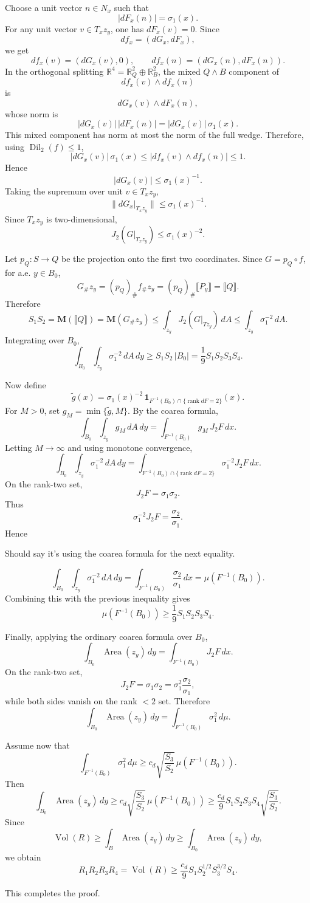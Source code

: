 \documentclass[12pt]{article}
\newcommand{\review}[1]{\begin{reviewbox}#1\end{reviewbox}}
\begin{document}
Choose a unit vector \(n\in N_x\) such that
\[
|dF_x(n)|=\sigma_1(x).
\]
For any unit vector \(v\in T_xz_y\), one has \(dF_x(v)=0\). Since
\[
df_x=(dG_x,dF_x),
\]
we get
\[
df_x(v)=(dG_x(v),0),
\qquad
df_x(n)=(dG_x(n),dF_x(n)).
\]
In the orthogonal splitting \(\mathbb R^4=\mathbb R^2_Q\oplus\mathbb R^2_B\), the mixed \(Q\wedge B\) component of
\[
df_x(v)\wedge df_x(n)
\]
is
\[
dG_x(v)\wedge dF_x(n),
\]
whose norm is
\[
|dG_x(v)|\,|dF_x(n)|
=
|dG_x(v)|\,\sigma_1(x).
\]
This mixed component has norm at most the norm of the full wedge. Therefore, using \(\operatorname{Dil}_2(f)\le 1\),
\[
|dG_x(v)|\,\sigma_1(x)
\le
|df_x(v)\wedge df_x(n)|
\le 1.
\]
Hence
\[
|dG_x(v)|\le \sigma_1(x)^{-1}.
\]
Taking the supremum over unit \(v\in T_xz_y\),
\[
\|dG_x|_{T_xz_y}\|\le \sigma_1(x)^{-1}.
\]
Since \(T_xz_y\) is two-dimensional,
\[
J_2(G|_{T_xz_y})\le \sigma_1(x)^{-2}.
\]

Let \(p_Q:S\to Q\) be the projection onto the first two coordinates. Since \(G=p_Q\circ f\), for a.e. \(y\in B_0\),
\[
G_\#z_y
=
(p_Q)_\# f_\#z_y
=
(p_Q)_\#\llbracket P_y\rrbracket
=
\llbracket Q\rrbracket.
\]
Therefore
\[
S_1S_2
=
\mathbf M(\llbracket Q\rrbracket)
=
\mathbf M(G_\#z_y)
\le
\int_{z_y}J_2(G|_{Tz_y})\,dA
\le
\int_{z_y}\sigma_1^{-2}\,dA.
\]
Integrating over \(B_0\),
\[
\int_{B_0}\int_{z_y}\sigma_1^{-2}\,dA\,dy
\ge
S_1S_2\,|B_0|
=
\frac19 S_1S_2S_3S_4.
\]

Now define
\[
\widetilde g(x)
=
\sigma_1(x)^{-2}\,
\mathbf 1_{F^{-1}(B_0)\cap\{\operatorname{rank}dF=2\}}(x).
\]
For \(M>0\), set \(g_M=\min\{\widetilde g,M\}\). By the coarea formula,
\[
\int_{B_0}\int_{z_y} g_M\,dA\,dy
=
\int_{F^{-1}(B_0)}g_M\,J_2F\,dx.
\]
Letting \(M\to\infty\) and using monotone convergence,
\[
\int_{B_0}\int_{z_y}\sigma_1^{-2}\,dA\,dy
=
\int_{F^{-1}(B_0)\cap\{\operatorname{rank}dF=2\}}
\sigma_1^{-2}J_2F\,dx.
\]
On the rank-two set,
\[
J_2F=\sigma_1\sigma_2.
\]
Thus
\[
\sigma_1^{-2}J_2F
=
\frac{\sigma_2}{\sigma_1}.
\]
Hence \review{Should say it's using the coarea formula for the next equality.}
\[
\int_{B_0}\int_{z_y}\sigma_1^{-2}\,dA\,dy
=
\int_{F^{-1}(B_0)}\frac{\sigma_2}{\sigma_1}\,dx
=
\mu(F^{-1}(B_0)).
\]
Combining this with the previous inequality gives
\[
\mu(F^{-1}(B_0))
\ge
\frac19 S_1S_2S_3S_4.
\]

Finally, applying the ordinary coarea formula over \(B_0\),
\[
\int_{B_0}\operatorname{Area}(z_y)\,dy
=
\int_{F^{-1}(B_0)}J_2F\,dx.
\]
On the rank-two set,
\[
J_2F=\sigma_1\sigma_2
=
\sigma_1^2\frac{\sigma_2}{\sigma_1},
\]
while both sides vanish on the rank \(<2\) set. Therefore
\[
\int_{B_0}\operatorname{Area}(z_y)\,dy
=
\int_{F^{-1}(B_0)}\sigma_1^2\,d\mu.
\]

Assume now that
\[
\int_{F^{-1}(B_0)}\sigma_1^2\,d\mu
\ge
c_d\sqrt{\frac{S_3}{S_2}}\,
\mu(F^{-1}(B_0)).
\]
Then
\[
\int_{B_0}\operatorname{Area}(z_y)\,dy
\ge
c_d\sqrt{\frac{S_3}{S_2}}\,
\mu(F^{-1}(B_0))
\ge
\frac{c_d}{9}
S_1S_2S_3S_4
\sqrt{\frac{S_3}{S_2}}.
\]
Since
\[
\operatorname{Vol}(R)
\ge
\int_B\operatorname{Area}(z_y)\,dy
\ge
\int_{B_0}\operatorname{Area}(z_y)\,dy,
\]
we obtain
\[
R_1R_2R_3R_4
=
\operatorname{Vol}(R)
\ge
\frac{c_d}{9}
S_1S_2^{1/2}S_3^{3/2}S_4.
\]

This completes the proof.
\end{document}
